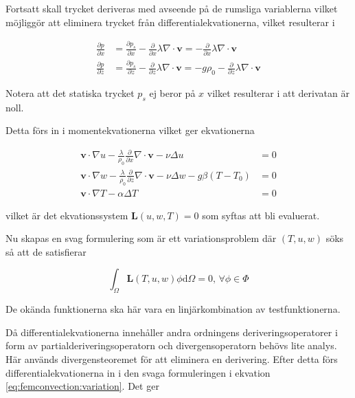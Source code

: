 Fortsatt skall trycket deriveras med avseende på de rumsliga variablerna vilket möjliggör
att eliminera trycket från differentialekvationerna, vilket resulterar i

\begin{align}
\label{eq:femconvection:partx}
\frac{\partial p}{\partial x} &= \frac{\partial p_s}{\partial x} -
\frac{\partial}{\partial x} \lambda\nabla\cdot\mathbf{v} = -
\frac{\partial}{\partial x} \lambda\nabla\cdot\mathbf{v}
\\
\label{eq:femconvection:partz}
\frac{\partial p}{\partial z} &= \frac{\partial p_s}{\partial z} -
\frac{\partial}{\partial z} \lambda\nabla\cdot\mathbf{v} =
-g\rho_0 - \frac{\partial}{\partial z} \lambda\nabla\cdot\mathbf{v}
\end{align}

Notera att det statiska trycket
$p_s$ ej beror på $x$ vilket resulterar i att derivatan är noll.

Detta förs in i momentekvationerna vilket ger ekvationerna

\begin{align}
\label{eq:femconvection:u}
\mathbf{v}\cdot\nabla u -
\frac{\lambda}{\rho_0}\frac{\partial}{\partial x}\nabla\cdot\mathbf{v} -\nu\Delta u &= 0
\\
\label{eq:femconvection:w}
\mathbf{v}\cdot\nabla w -
\frac{\lambda}{\rho_0}\frac{\partial}{\partial z}\nabla\cdot\mathbf{v}
- \nu\Delta w - g\beta(T-T_0) &= 0 \\ 
\label{eq:femconvection:T}
\mathbf{v}\cdot\nabla T - \alpha\Delta T &= 0
\end{align}

vilket är det ekvationssystem $\mathbf{L}(u,w,T) = 0$
som syftas att bli evaluerat.

Nu skapas en svag formulering som är ett variationsproblem där $(T,u,w)$ söks
så att de satisfierar

\begin{equation}
\label{eq:femconvection:variation}
\int_\Omega \mathbf{L}(T,u,w) \phi \mathrm{d}\Omega = 0\mbox{,  } \forall \phi \in \Phi
\end{equation}

De okända funktionerna ska här vara en linjärkombination av testfunktionerna.

Då differentialekvationerna innehåller andra ordningens deriveringsoperatorer i form av
partialderiveringsoperatorn och divergensoperatorn behövs lite analys.
Här används divergensteoremet för att eliminera en derivering. Efter detta
förs differentialekvationerna in i den svaga formuleringen i ekvation
\eqref{eq:femconvection:variation}.
Det ger

